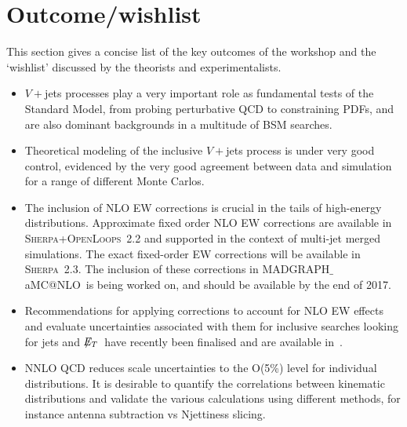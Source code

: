 \documentclass[a4paper,11pt,notoc]{article}
\makeatletter
\newcommand{\met}{\ensuremath{\not\!\!E_T}}
\newcommand{\SHERPA}{\textsc{Sherpa}}
\newcommand{\OPENLOOPS}{\textsc{OpenLoops}}
\newcommand{\MGNLO}{MADGRAPH$\_$aMC@NLO}
\makeatother
\begin{document}
\section{Outcome/wishlist}
This section gives a concise list of the key outcomes of the workshop and the `wishlist' discussed by the theorists and experimentalists. 
\begin{itemize}
\item $V+$jets processes play a very important role as fundamental tests of the Standard Model, from probing perturbative QCD to constraining PDFs, and are also dominant backgrounds in a multitude of BSM searches.
\item Theoretical modeling of the inclusive $V+$jets process is under very good control, evidenced by the very good agreement between data and simulation for a range of different Monte Carlos.
\item The inclusion of NLO EW corrections is crucial in the tails of high-energy distributions. Approximate fixed order NLO EW corrections are available in \SHERPA+\OPENLOOPS\ 2.2 and supported in the context of multi-jet merged simulations. The exact fixed-order EW corrections will be available in \SHERPA\ 2.3. The inclusion of these corrections in \MGNLO\ is being worked on, and should be available by the end of 2017.

\item Recommendations for applying corrections to account for NLO EW effects and evaluate uncertainties associated with them for inclusive searches looking for jets and \met\ have recently been finalised and are available in~\cite{Lindert:2017olm}.
\item NNLO QCD reduces scale uncertainties to the O(5\%) level for individual distributions. It is desirable to quantify the correlations between kinematic distributions and validate the various calculations using different methods, for instance antenna subtraction vs Njettiness slicing.


\end{itemize}
\end{document}
